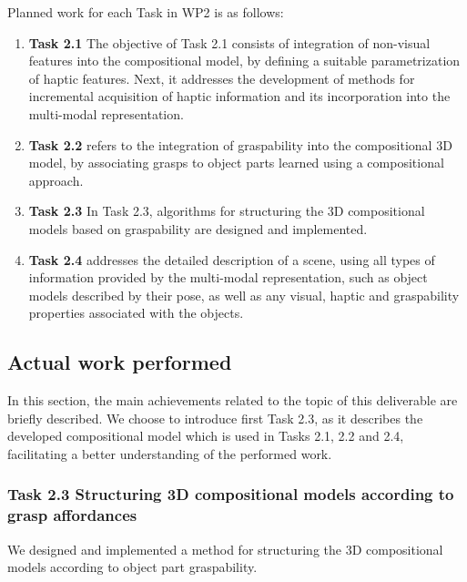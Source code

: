 \documentclass[a4paper,11pt,pdf]{pacmanreport}
\begin{document}
Planned work for each Task in WP2 is as follows:
\begin{enumerate}

\item[] \textbf{Task 2.1} The objective of Task 2.1 consists of integration of 
non-visual features into the compositional model, by defining a suitable 
parametrization of haptic features. Next, it addresses the development of 
methods for incremental acquisition of haptic information and its incorporation 
into the multi-modal representation. 

\item[] \textbf{Task 2.2} refers to the integration of graspability into the 
compositional 3D model, by associating grasps to object parts learned using a 
compositional approach.

\item[] \textbf{Task 2.3} In Task 2.3, algorithms for structuring the 3D 
compositional models based on graspability are designed and implemented.

\item[] \textbf{Task 2.4} addresses the detailed description of a scene, using 
all types of information provided by the multi-modal representation, such as 
object models described by their pose, as well as any visual, haptic and 
graspability properties associated with the objects.

\end{enumerate}

\subsection{Actual work performed}

In this section, the main achievements related to the topic of this deliverable are briefly described.
We choose to introduce first Task 2.3, as it describes the developed compositional model which is used in Tasks 2.1, 2.2 and 2.4, facilitating a 
better understanding of the performed work.


\subsubsection{Task 2.3 Structuring 3D compositional models according to grasp affordances}

We designed and implemented a method for structuring the 3D compositional models according to object part graspability.
\end{document}
